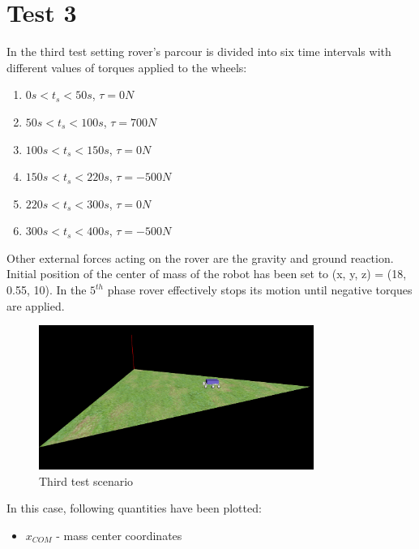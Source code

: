 \newpage
\section{Test 3}
\label{Sec:test_3}

In the third test setting rover's parcour is divided into six time intervals with different values of torques applied to the wheels:

\begin{enumerate} 
  \item $0s < t_s < 50s$, $\tau = 0N$           
  \item $50s < t_s < 100s$, $\tau = 700N$        
  \item $100s < t_s < 150s$, $\tau = 0N$         
  \item $150s < t_s < 220s$, $\tau = -500N$
  \item $220s < t_s < 300s$, $\tau = 0N$         
  \item $300s < t_s < 400s$, $\tau = -500N$ 
\end{enumerate}

\noindent Other external forces acting on the rover are the gravity and ground reaction. Initial position of the center of mass of the robot
has been set to (x, y, z) = (18, 0.55, 10). In the $5^{th}$ phase rover effectively stops its motion until negative torques are applied.

\begin{figure}[H]
  \centering
    \includegraphics[width=0.8\textwidth]{run_1}
  \caption{Third test scenario}
\end{figure}

\noindent In this case, following quantities have been plotted:

\begin{itemize}
  \item $x_{COM}$ - mass center coordinates
\end{itemize}

